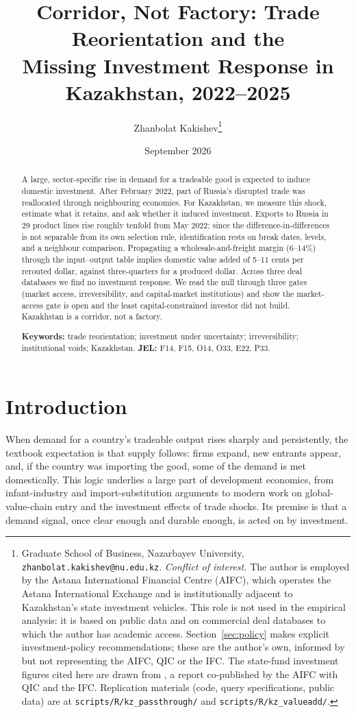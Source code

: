 \documentclass[12pt]{article}
\title{Corridor, Not Factory: Trade Reorientation and the\\
Missing Investment Response in Kazakhstan, 2022--2025}
\author{Zhanbolat Kakishev\thanks{Graduate School of Business, Nazarbayev University, \texttt{zhanbolat.kakishev@nu.edu.kz}.
\emph{Conflict of interest.} The author is employed by the Astana International Financial
Centre (AIFC), which operates the Astana International Exchange and is institutionally adjacent
to Kazakhstan's state investment vehicles. This role is not used in the empirical analysis: it
is based on public data and on commercial deal databases to which the author has academic access.
Section~\ref{sec:policy} makes explicit investment-policy recommendations; these are the
author's own, informed by but not representing the AIFC, QIC or the IFC.
The state-fund investment figures cited here are drawn from \citet{qicaifcifc2026pe}, a report
co-published by the AIFC with QIC and the IFC.
Replication materials (code, query specifications, public data) are at
\texttt{scripts/R/kz\_passthrough/} and \texttt{scripts/R/kz\_valueadd/}.}}
\date{September 2026}
\begin{document}
\maketitle

\begin{abstract}
\noindent A large, sector-specific rise in demand for a tradeable good is expected to induce
domestic investment. After February 2022, part of Russia's disrupted trade was reallocated
through neighbouring economies. For Kazakhstan, we measure this shock, estimate what it
retains, and ask whether it induced investment. Exports to Russia in 29 product lines rise
roughly tenfold from May 2022; since the difference-in-differences is not separable from its
own selection rule, identification rests on break dates, levels, and a neighbour comparison.
Propagating a wholesale-and-freight margin (6--14\%) through the input--output table implies
domestic value added of 5--11 cents per rerouted dollar, against three-quarters for a produced
dollar. Across three deal databases we find no investment response. We read the null through
three gates (market access, irreversibility, and capital-market institutions) and show
the market-access gate is open and the least capital-constrained investor did not build.
Kazakhstan is a corridor, not a factory.

\medskip
\noindent\textbf{Keywords:} trade reorientation; investment under uncertainty; irreversibility;
institutional voids; Kazakhstan.
\quad\textbf{JEL:} F14, F15, O14, O33, E22, P33.
\end{abstract}

\clearpage

\section{Introduction}

When demand for a country's tradeable output rises sharply and persistently, the textbook
expectation is that supply follows: firms expand, new entrants appear, and, if the country
was importing the good, some of the demand is met domestically. This logic underlies a large
part of development economics, from infant-industry and import-substitution arguments to
modern work on global-value-chain entry and the investment effects of trade shocks. Its
premise is that a demand signal, once clear enough and durable enough, is acted on by
investment.
\end{document}
